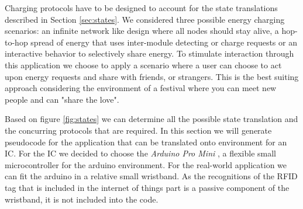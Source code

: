 %
Charging protocols have to be designed to account for the state translations described in Section \ref{sec:states}. We considered three possible energy charging scenarios: an infinite network like design where all nodes should stay alive, a hop-to-hop spread of energy that uses inter-module detecting or charge requests or an interactive behavior to selectively share energy. To stimulate interaction through this application we choose to apply a scenario where a user can choose to act upon energy requests and share with friends, or strangers. This is the best suiting approach considering the environment of a festival where you can meet new people and can "share the love". 

Based on figure \ref{fig:states} we can determine all the possible state translation and the concurring protocols that are required. In this section we will generate pseudocode for the application that can be translated onto environment for an IC. For the IC we decided to choose the \emph{Arduino Pro Mini} \cite{promini}, a flexible small microcontroller for the arduino environment. For the real-world application we can fit the arduino in a relative small wristband.  As the recognitions of the RFID tag that is included in the internet of things part is a passive component of the wristband, it is not included into the code. 
\\

%


